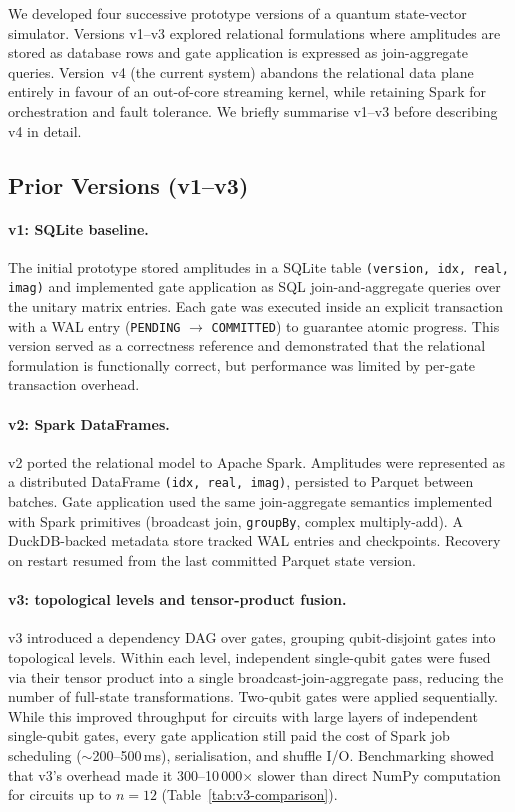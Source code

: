 We developed four successive prototype versions of a quantum state-vector simulator.
Versions v1--v3 explored relational formulations where amplitudes are stored as
database rows and gate application is expressed as join-aggregate queries. Version~v4
(the current system) abandons the relational data plane entirely in favour of an
out-of-core streaming kernel, while retaining Spark for orchestration and fault
tolerance. We briefly summarise v1--v3 before describing v4 in detail.

\subsection{Prior Versions (v1--v3)}
\label{sec:prior-versions}

\paragraph{v1: SQLite baseline.}
The initial prototype stored amplitudes in a SQLite table
\texttt{(version, idx, real, imag)} and implemented gate application as SQL
join-and-aggregate queries over the unitary matrix entries.
Each gate was executed inside an explicit transaction with a WAL entry
(\texttt{PENDING} $\to$ \texttt{COMMITTED}) to guarantee atomic progress.
This version served as a correctness reference and demonstrated that the
relational formulation is functionally correct, but performance was limited
by per-gate transaction overhead.

\paragraph{v2: Spark DataFrames.}
v2 ported the relational model to Apache Spark. Amplitudes were represented as
a distributed DataFrame \texttt{(idx, real, imag)}, persisted to Parquet between
batches. Gate application used the same join-aggregate semantics implemented with
Spark primitives (broadcast join, \texttt{groupBy}, complex multiply-add). A
DuckDB-backed metadata store tracked WAL entries and checkpoints. Recovery on
restart resumed from the last committed Parquet state version.

\paragraph{v3: topological levels and tensor-product fusion.}
v3 introduced a dependency DAG over gates, grouping qubit-disjoint gates into
topological levels. Within each level, independent single-qubit gates were fused
via their tensor product into a single broadcast-join-aggregate pass, reducing the
number of full-state transformations. Two-qubit gates were applied sequentially.
While this improved throughput for circuits with large layers of independent
single-qubit gates, every gate application still paid the cost of Spark job
scheduling ($\sim$200--500\,ms), serialisation, and shuffle I/O.
Benchmarking showed that v3's overhead made it 300--10\,000$\times$ slower than
direct NumPy computation for circuits up to $n=12$ (Table~\ref{tab:v3-comparison}).

